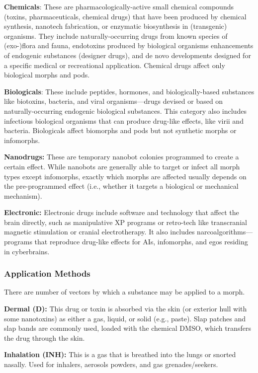 \textbf{Chemicals}: These are pharmacologically-active 
small chemical compounds (toxins, pharmaceuticals, 
chemical drugs) that have been produced by chemical 
synthesis, nanotech fabrication, or enzymatic biosynthesis
in (transgenic) organisms. They include naturally-occurring
drugs from known species of (exo-)flora
and fauna, endotoxins produced by biological organisms
enhancements of endogenic substances (designer
drugs), and de novo developments designed for a 
specific medical or recreational application. Chemical 
drugs affect only biological morphs and pods.

\textbf{Biologicals}: These include peptides, hormones, and 
biologically-based substances like biotoxins, bacteria, 
and viral organisms—drugs devised or based on 
naturally-occurring endogenic biological substances. 
This category also includes infectious biological organisms
that can produce drug-like effects, like virii
and bacteria. Biologicals affect biomorphs and pods 
but not synthetic morphs or infomorphs.

\textbf{Nanodrugs: }These are temporary nanobot colonies 
programmed to create a certain effect. While nanobots
are generally able to target or infect all morph
types except infomorphs, exactly which morphs are 
affected usually depends on the pre-programmed 
effect (i.e., whether it targets a biological or mechanical
mechanism).

\textbf{Electronic: }Electronic drugs include software and 
technology that affect the brain directly, such as manipulative
XP programs or retro-tech like transcranial
magnetic stimulation or cranial electrotherapy. It also 
includes narcoalgorithms—programs that reproduce 
drug-like effects for AIs, infomorphs, and egos residing
in cyberbrains.

\subsubsection{Application Methods}

There are number of vectors by which a substance 
may be applied to a morph.

\textbf{Dermal (D): }This drug or toxin is absorbed via 
the skin (or exterior hull with some nanotoxins) as 
either a gas, liquid, or solid (e.g., paste). Slap patches 
and slap bands are commonly used, loaded with the 
chemical DMSO, which transfers the drug through 
the skin.

\textbf{Inhalation (INH):} This is a gas that is breathed into 
the lungs or snorted nasally. Used for inhalers, aerosols
powders, and gas grenades/seekers.


